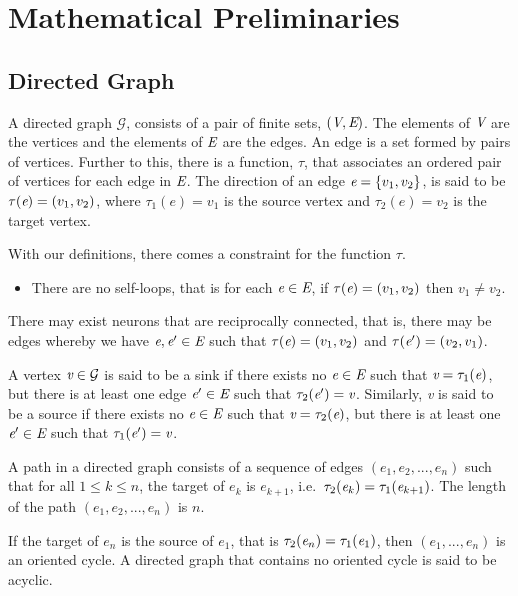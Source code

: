 \section{Mathematical Preliminaries}
\subsection{Directed Graph}
A directed graph $\mathcal{G}$, consists of a pair of finite sets, $(\emph{V},\emph{E})$. The elements of $\emph{V}$ are the vertices and the elements of $\emph{E}$ are the edges. An edge is a set formed by pairs of vertices. Further to this, there is a function, $\tau$, that associates an ordered pair of vertices for each edge in $\emph{E}$. The direction of an edge $\emph{e} = \{v_1, v_2\}$, is said to be $\tau(\emph{e}) = (v_1, v_2)$, where $\tau_{1}(e) = v_1$ is the source vertex and $\tau_{2}(e) = v_2$ is the target vertex.

With our definitions, there comes a constraint for the function $\tau$.
\begin{itemize}
\item There are no self-loops, that is for each $\emph{e} \in \emph{E}$, if $\tau(\emph{e}) = (v_1, v_2)$ then $v_1 \neq v_2$.
\end{itemize}

There may exist neurons that are reciprocally connected, that is, there may be edges whereby we have $\emph{e}, \emph{e}^\prime \in \emph{E}$ such that $\tau(\emph{e})=(v_1,v_2)$ and $\tau(\emph{e}^\prime) = (v_2,v_1)$.

A vertex $\emph{v} \in \mathcal{G}$ is said to be a sink if there exists no $\emph{e} \in \emph{E}$ such that $\emph{v}=\tau_1(\emph{e})$, but there is at least one edge $\emph{e}^\prime \in \emph{E}$ such that $\tau_2(\emph{e}^\prime) = \emph{v}$. Similarly, \emph{v} is said to be a source if there exists no $\emph{e} \in \emph{E}$ such that $\emph{v} = \tau_2(\emph{e})$, but there is at least one $\emph{e}^\prime \in \emph{E}$ such that $\tau_1(\emph{e}^\prime) = \emph{v}$.

A path in a directed graph consists of a sequence of edges $(e_1, e_2, ..., e_n)$ such that for all $1 \leq k \leq n$, the target of $e_k$ is $e_{k+1}$, i.e.~$\tau_2(\emph{e}_k) = \tau_1(\emph{e}_{k+1})$. The length of the path $(e_1, e_2, ..., e_n)$ is $n$.

If the target of $e_n$ is the source of $e_1$, that is $\tau_2(\emph{e}_n) = \tau_1(\emph{e}_1)$, then $(e_1, ..., e_n)$ is an oriented cycle. A directed graph that contains no oriented cycle is said to be acyclic.

